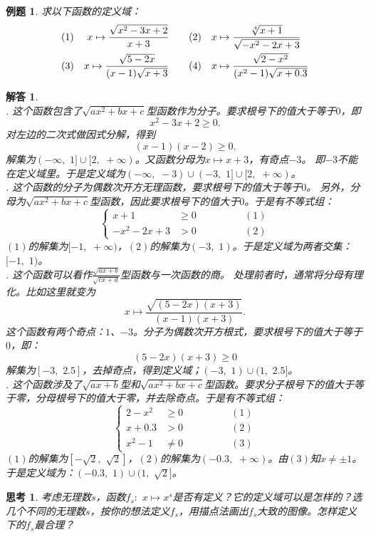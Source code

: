 \documentclass[12pt,UTF8]{ctexbook}
\newtheorem{et}{例题}[section]
\newtheorem{sk}{思考}[section]
\newtheorem*{so}{解答}
\begin{document}
\begin{et}
    求以下函数的定义域：\\
    \begin{align}
        (1) \,\,\quad x\mapsto \frac{\sqrt{x^2 - 3x + 2}}{x + 3} \quad & \quad (2) \quad x\mapsto \frac{\sqrt[4]{x + 1}}{\sqrt{- x^2 - 2x + 3}}\notag \\
        (3) \quad x\mapsto \frac{\sqrt{5 - 2x}}{(x - 1)\sqrt{x + 3}} \quad & \quad (4)\quad x\mapsto \frac{\sqrt{2 - x^2}}{(x^2 - 1)\sqrt{x + 0.3}} \notag 
    \end{align}
\end{et}
\begin{so}
    \mbox{}\\
    . 这个函数包含了$\sqrt{ax^2 + bx + c}$型函数作为分子。要求根号下的值大于等于$0$，即
    $$ x^2 - 3x + 2 \geqslant 0.$$
    对左边的二次式做因式分解，得到
    $$ (x - 1)(x - 2) \geqslant 0.$$
    解集为$(-\infty, \,\, 1]\cup[2, \,\, +\infty)$。又函数分母为$x\mapsto x + 3$，有奇点$-3$。
    即$-3$不能在定义域里。于是定义域为$(-\infty,\,\,  -3)\cup(-3, \,\, 1]\cup[2,\,\,  +\infty)$。\\
    . 这个函数的分子为偶数次开方无理函数，要求根号下的值大于等于$0$。
    另外，分母为$\sqrt{ax^2 + bx + c}$型函数，因此要求根号下的值大于$0$。于是有不等式组：
    $$\left\{\begin{array}{ccr}
        x + 1 &\geqslant 0 & \quad\quad\quad\quad (1) \\
        - x^2 - 2x + 3 &> 0  & \quad\quad\quad\quad (2)
    \end{array}\right.$$
    $(1)$的解集为$[-1,\,\, +\infty)$，$(2)$的解集为$(-3,\,\,  1)$。于是定义域为两者交集：$[-1,\,\,  1)$。\\
    . 这个函数可以看作$\frac{\sqrt{ax + b}}{\sqrt{cx + d}}$型函数与一次函数的商。
    处理前者时，通常将分母有理化。比如这里就变为
    $$ x \mapsto \frac{\sqrt{(5 - 2x)(x + 3)}}{(x - 1)(x + 3)}. $$
    这个函数有两个奇点：$1$、$-3$。分子为偶数次开方根式，要求根号下的值大于等于$0$，即：
    $$ (5 - 2x)(x + 3) \geqslant 0$$
    解集为$[-3, \,\, 2.5]$，去掉奇点，得到定义域；$(-3, \,\, 1)\cup(1, \,\, 2.5]$。\\
    . 这个函数涉及了$\sqrt{ax + b}$型和$\sqrt{ax^2 + bx + c}$型函数。要求分子根号下的值大于等于零，分母根号下的值大于零，并去除奇点。于是有不等式组：
    $$\left\{\begin{array}{ccr}
        2 - x^2 &\geqslant 0 & \quad\quad\quad\quad (1) \\
        x + 0.3 &> 0  & \quad\quad\quad\quad (2) \\
        x^2 - 1 &\neq 0 & \quad\quad\quad\quad (3) 
    \end{array}\right.$$
    $(1)$的解集为$[-\sqrt{2}, \,\, \sqrt{2}]$，$(2)$的解集为$(-0.3,\,\,  +\infty)$。由$(3)$知$x\neq \pm 1$。
    于是定义域为：$(-0.3, \,\, 1)\cup(1, \,\, \sqrt{2}]$。
\end{so}
\begin{sk}
    考虑无理数$s$，函数$f_s: \,\, x\mapsto x^s$是否有定义？它的定义域可以是怎样的？选几个不同的无理数$s$，按你的想法定义$f_s$，用描点法画出$f_s$大致的图像。怎样定义下的$f_s$最合理？
\end{sk}
\end{document}
